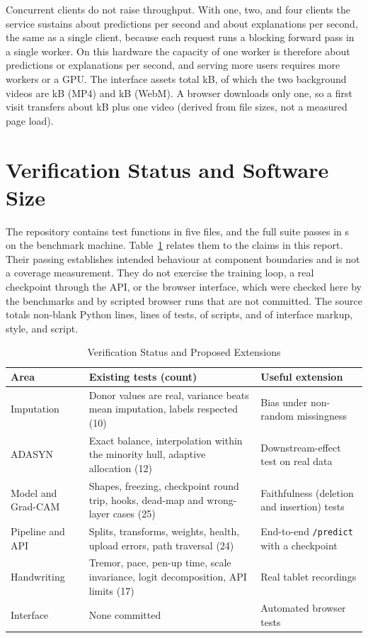 \documentclass[conference]{IEEEtran}
\begin{document}


Concurrent clients do not raise throughput. With one, two, and four clients the service sustains about \PredPerS{} predictions per second and about \ExpPerS{} explanations per second, the same as a single client, because each request runs a blocking forward pass in a single worker. On this hardware the capacity of one worker is therefore about \PredPerS{} predictions or \ExpPerS{} explanations per second, and serving more users requires more workers or a GPU. The interface assets total \StaticTotalKb{} kB, of which the two background videos are \MpFourKb{} kB (MP4) and \WebmKb{} kB (WebM). A browser downloads only one, so a first visit transfers about \StaticNoVideoKb{} kB plus one video (derived from file sizes, not a measured page load).

\section{Verification Status and Software Size}
The repository contains \TestCount{} test functions in five files, and the full suite passes in \TestSeconds{} s on the benchmark machine. Table~\ref{tab:verify} relates them to the claims in this report. Their passing establishes intended behaviour at component boundaries and is not a coverage measurement. They do not exercise the training loop, a real checkpoint through the API, or the browser interface, which were checked here by the benchmarks and by scripted browser runs that are not committed. The source totals \LocSrc{} non-blank Python lines, \LocTests{} lines of tests, \LocScripts{} of scripts, and \LocFront{} of interface markup, style, and script.

\begin{table}[t]
\centering
\caption{Verification Status and Proposed Extensions}
\label{tab:verify}
\footnotesize
\begin{tabular}{@{}p{1.45cm}p{2.9cm}p{3.3cm}@{}}
\toprule
Area & Existing tests (count) & Useful extension \\
\midrule
Imputation & Donor values are real, variance beats mean imputation, labels respected (10) & Bias under non-random missingness \\
ADASYN & Exact balance, interpolation within the minority hull, adaptive allocation (12) & Downstream-effect test on real data \\
Model and Grad-CAM & Shapes, freezing, checkpoint round trip, hooks, dead-map and wrong-layer cases (25) & Faithfulness (deletion and insertion) tests \\
Pipeline and API & Splits, transforms, weights, health, upload errors, path traversal (24) & End-to-end \texttt{/predict} with a checkpoint \\
Handwriting & Tremor, pace, pen-up time, scale invariance, logit decomposition, API limits (17) & Real tablet recordings \\
Interface & None committed & Automated browser tests \\
\bottomrule
\end{tabular}
\end{table}
\end{document}
